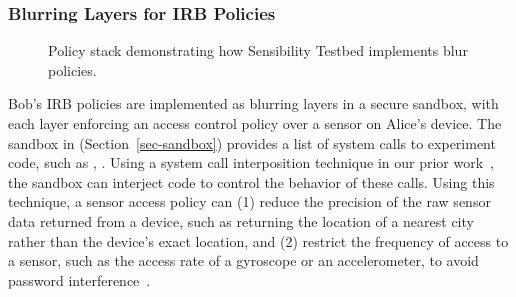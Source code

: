 \subsubsection{Blurring Layers for IRB Policies}\label{sec-bob-policy}

\begin{figure}
\caption{\small Policy stack demonstrating how Sensibility Testbed implements blur policies.
\label{fig-blur}}
\end{figure}

Bob's IRB policies are implemented as blurring layers in a secure sandbox, with 
each layer enforcing an access control policy over a sensor on Alice's device. 
The sandbox in \sysname (Section~\ref{sec-sandbox}) provides a list of system 
calls to experiment code, such as , . 
Using a system call interposition technique in our prior work~\cite{cappos2010retaining}, 
the sandbox can interject code to control the behavior of these calls. Using this 
technique, a sensor access policy can (1) reduce the precision of the raw sensor data 
returned from a device, such as returning the location of a nearest city rather than the 
device's exact location, and (2) restrict the frequency of access to a sensor, such as the 
access rate of a gyroscope or an accelerometer, to avoid password 
interference~\cite{michalevsky2014gyrophone}.



